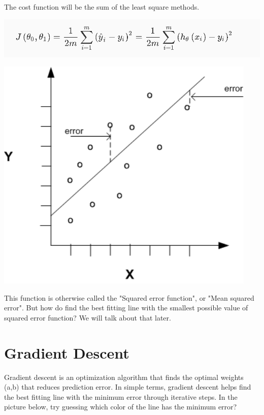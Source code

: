 \documentclass{42-en}
\begin{document}
The cost function will be the sum of the least square methods.\\

\centerline{\includegraphics[width=150mm]{images/costFunction.png}}

\centerline{\includegraphics[width=125mm]{images/cost_graph.png}}

This function is otherwise called the "Squared error function", or "Mean squared error". But how do find the best fitting line with the smallest possible value of squared error function? We will talk about that later.\\

\section*{Gradient Descent}


Gradient descent is an optimization algorithm that finds the optimal weights (a,b) that reduces prediction error. In simple terms, gradient descent helps find the best fitting line with the minimum error through iterative steps. In the picture below, try guessing which color of the line has the minimum error?\\
\end{document}
